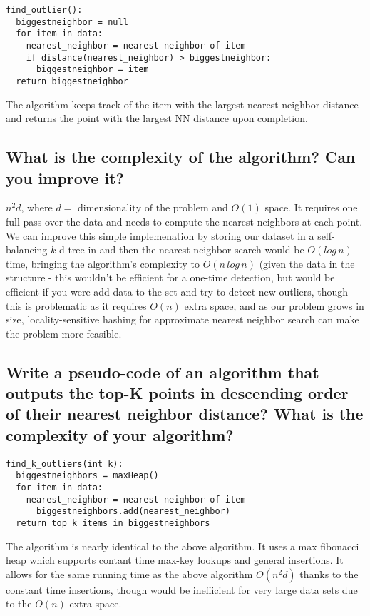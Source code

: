 \documentclass{article}
\begin{document}
\begin{lstlisting}
find_outlier():
  biggestneighbor = null
  for item in data:
    nearest_neighbor = nearest neighbor of item
    if distance(nearest_neighbor) > biggestneighbor:
      biggestneighbor = item
  return biggestneighbor
\end{lstlisting}
The algorithm keeps track of the item with the largest nearest neighbor
distance and returns the point with the largest NN distance upon completion. 


\subsection{What is the complexity of the algorithm? Can you improve it?}
$n^2d$, where $d= \text{ dimensionality of the problem}$ and $O(1)$ space. It
requires one full pass over the data and needs to compute the nearest neighbors
at each point. We can improve this simple implemenation by storing our
dataset in a self-balancing $k$-d tree in and then
the nearest neighbor search would be $O(log\, n)$ time, bringing the
algorithm's complexity to $O(n\, log\,n)$ (given the data in the structure -
this wouldn't be efficient for a one-time detection, but would be efficient if
you were add data to the set and try to detect new outliers, though this is
problematic as it requires $O(n)$ extra space, and as our problem grows in
size, locality-sensitive hashing for approximate nearest neighbor search can
make the problem more feasible. 


 \subsection{ Write a pseudo-code of an algorithm that outputs the top-K points
 in descending order of their nearest neighbor distance? What is the complexity
 of your algorithm?}
\begin{lstlisting}
find_k_outliers(int k):
  biggestneighbors = maxHeap()
  for item in data:
    nearest_neighbor = nearest neighbor of item
      biggestneighbors.add(nearest_neighbor)
  return top k items in biggestneighbors
\end{lstlisting}
  
  The algorithm is nearly identical to the above algorithm. It uses a max
  fibonacci heap which supports contant time max-key lookups and general insertions. 
  It allows for the same running time as the above algorithm $O(n^2d)$ thanks to the
  constant time insertions, though would be inefficient for very large data
  sets due to the $O(n)$ extra space.   
  
  
  
  
  
  
\end{document}
